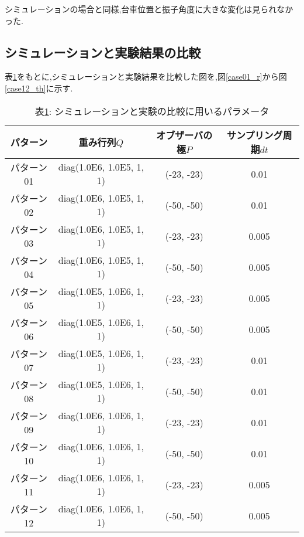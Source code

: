 シミュレーションの場合と同様,台車位置と振子角度に大きな変化は見られなかった.


\subsection{シミュレーションと実験結果の比較}
表\ref{sim_exp}をもとに,シミュレーションと実験結果を比較した図を,図\ref{case01_r}から図\ref{case12_th}に示す.

\begin{table}[htbp]
	\begin{center}
    \caption{表\ref{sim_exp}: シミュレーションと実験の比較に用いるパラメータ}
		\begin{tabular}{|c|c|c|c|} \hline
			パターン & 重み行列$Q$ & オブザーバの極$P$ & サンプリング周期$dt$ \\ \hline\hline
			パターン01 & diag(1.0E6, 1.0E5, 1, 1) & (-23, -23) & 0.01  \\ \hline
			パターン02 & diag(1.0E6, 1.0E5, 1, 1) & (-50, -50) & 0.01  \\ \hline
			パターン03 & diag(1.0E6, 1.0E5, 1, 1) & (-23, -23) & 0.005 \\ \hline
			パターン04 & diag(1.0E6, 1.0E5, 1, 1) & (-50, -50) & 0.005 \\ \hline
			パターン05 & diag(1.0E5, 1.0E6, 1, 1) & (-23, -23) & 0.005 \\ \hline
			パターン06 & diag(1.0E5, 1.0E6, 1, 1) & (-50, -50) & 0.005 \\ \hline
			パターン07 & diag(1.0E5, 1.0E6, 1, 1) & (-23, -23) & 0.01  \\ \hline
			パターン08 & diag(1.0E5, 1.0E6, 1, 1) & (-50, -50) & 0.01  \\ \hline
			パターン09 & diag(1.0E6, 1.0E6, 1, 1) & (-23, -23) & 0.01  \\ \hline
			パターン10 & diag(1.0E6, 1.0E6, 1, 1) & (-50, -50) & 0.01  \\ \hline
			パターン11 & diag(1.0E6, 1.0E6, 1, 1) & (-23, -23) & 0.005 \\ \hline
			パターン12 & diag(1.0E6, 1.0E6, 1, 1) & (-50, -50) & 0.005 \\ \hline
		\end{tabular}
		\label{sim_exp}
	\end{center}
\end{table}

